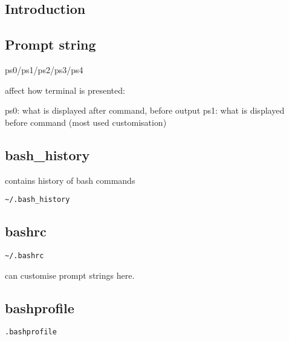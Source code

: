 
\subsection{Introduction}


\subsection{Prompt string}
ps0/ps1/ps2/ps3/ps4

affect how terminal is presented:

ps0: what is displayed after command, before output
ps1: what is displayed before command (most used customisation)


\subsection{bash\_history}
contains history of bash commands
\begin{verbatim}
~/.bash_history
\end{verbatim}
\subsection{bashrc}

\begin{verbatim}
~/.bashrc
\end{verbatim}

can customise prompt strings here.

\subsection{bashprofile}

\begin{verbatim}
.bashprofile
\end{verbatim}

